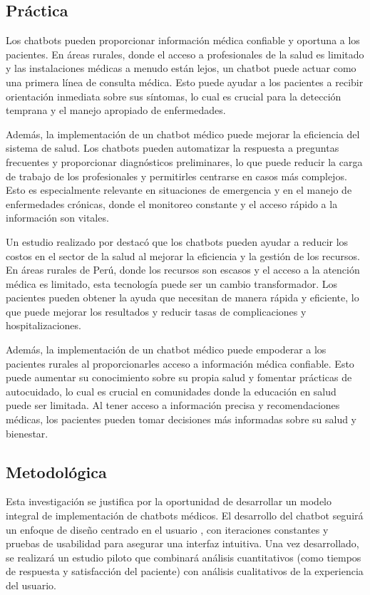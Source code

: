\subsection{Práctica}
Los chatbots pueden proporcionar información médica confiable y oportuna a los pacientes. En áreas rurales, donde el acceso a profesionales de la salud es limitado y las instalaciones médicas a menudo están lejos, un chatbot puede actuar como una primera línea de consulta médica. Esto puede ayudar a los pacientes a recibir orientación inmediata sobre sus síntomas, lo cual es crucial para la detección temprana y el manejo apropiado de enfermedades.

Además, la implementación de un chatbot médico puede mejorar la eficiencia del sistema de salud. Los chatbots pueden automatizar la respuesta a preguntas frecuentes y proporcionar diagnósticos preliminares, lo que puede reducir la carga de trabajo de los profesionales y permitirles centrarse en casos más complejos. Esto es especialmente relevante en situaciones de emergencia y en el manejo de enfermedades crónicas, donde el monitoreo constante y el acceso rápido a la información son vitales.

Un estudio realizado por \cite{Pricewaterhouse} destacó que los chatbots pueden ayudar a reducir los costos en el sector de la salud al mejorar la eficiencia y la gestión de los recursos. En áreas rurales de Perú, donde los recursos son escasos y el acceso a la atención médica es limitado, esta tecnología puede ser un cambio transformador. Los pacientes pueden obtener la ayuda que necesitan de manera rápida y eficiente, lo que puede mejorar los resultados y reducir tasas de complicaciones y hospitalizaciones.

Además, la implementación de un chatbot médico puede empoderar a los pacientes rurales al proporcionarles acceso a información médica confiable. Esto puede aumentar su conocimiento sobre su propia salud y fomentar prácticas de autocuidado, lo cual es crucial en comunidades donde la educación en salud puede ser limitada. Al tener acceso a información precisa y recomendaciones médicas, los pacientes pueden tomar decisiones más informadas sobre su salud y bienestar.

\subsection{Metodológica}

Esta investigación se justifica por la oportunidad de desarrollar un modelo integral de implementación de chatbots médicos. El desarrollo del chatbot seguirá un enfoque de diseño centrado en el usuario \cite{Norman1986}, con iteraciones constantes y pruebas de usabilidad para asegurar una interfaz intuitiva. Una vez desarrollado, se realizará un estudio piloto que combinará análisis cuantitativos (como tiempos de respuesta y satisfacción del paciente) con análisis cualitativos de la experiencia del usuario.

